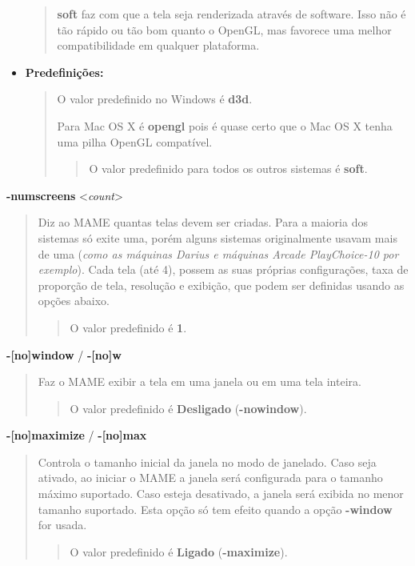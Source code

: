 \documentclass[letterpaper,10pt,brazil]{sphinxmanual}
\begin{document}
\begin{itemize}
\begin{quote}
\textbf{soft} faz com que a tela seja renderizada através de software.
Isso não é tão rápido ou tão bom quanto o OpenGL, mas favorece uma
melhor compatibilidade em qualquer plataforma.
\end{quote}

\item {} 
\textbf{Predefinições:}
\begin{quote}

O valor predefinido no Windows é \textbf{d3d}.

Para Mac OS X é \textbf{opengl} pois é quase certo que o Mac OS X tenha
uma pilha OpenGL compatível.
\begin{quote}

O valor predefinido para todos os outros sistemas é \textbf{soft}.
\end{quote}
\end{quote}

\end{itemize}
\label{commandline/commandline-all:mame-commandline-numscreens}
\textbf{-numscreens} \textless{}\emph{count}\textgreater{}
\begin{quote}

Diz ao MAME quantas telas devem ser criadas. Para a maioria dos
sistemas só exite uma, porém alguns sistemas originalmente usavam
mais de uma (\emph{como as máquinas Darius e máquinas Arcade
PlayChoice-10 por exemplo}). Cada tela (até 4), possem as suas
próprias configurações, taxa de proporção de tela, resolução e
exibição, que podem ser definidas usando as opções abaixo.
\begin{quote}

O valor predefinido é \textbf{1}.
\end{quote}
\end{quote}
\label{commandline/commandline-all:mame-commandline-window}
\textbf{-{[}no{]}window} / \textbf{-{[}no{]}w}
\begin{quote}

Faz o MAME exibir a tela em uma janela ou em uma tela inteira.
\begin{quote}

O valor predefinido é \textbf{Desligado} (\textbf{-nowindow}).
\end{quote}
\end{quote}
\label{commandline/commandline-all:mame-commandline-maximize}
\textbf{-{[}no{]}maximize} / \textbf{-{[}no{]}max}
\begin{quote}

Controla o tamanho inicial da janela no modo de janelado. Caso seja
ativado, ao iniciar o MAME a janela será configurada para o tamanho
máximo suportado. Caso esteja desativado, a janela será exibida no
menor tamanho suportado. Esta opção só tem efeito quando a opção
\textbf{-window} for usada.
\begin{quote}

O valor predefinido é \textbf{Ligado} (\textbf{-maximize}).
\end{quote}
\end{quote}
\end{document}
